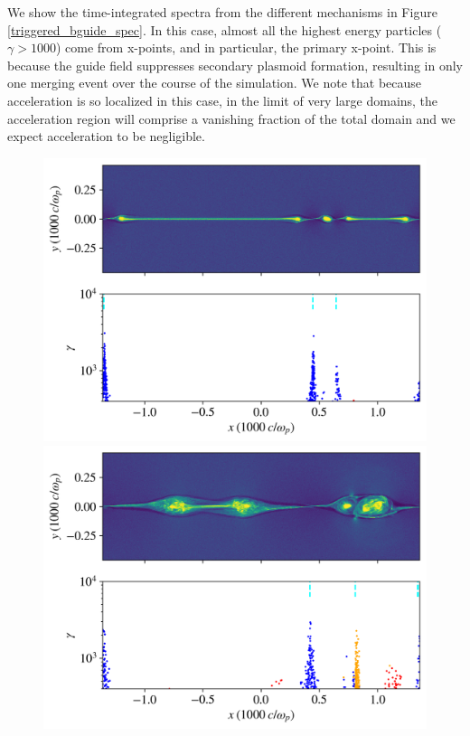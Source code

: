 \documentclass[iop,twocolappendix]{emulateapj}
\begin{document}
We show the time-integrated spectra from the different mechanisms in Figure \ref{triggered_bguide_spec}.  In this case, almost all the highest energy particles ($\gamma > 1000$) come from x-points, and in particular, the primary x-point.  This is because the guide field suppresses secondary plasmoid formation, resulting in only one merging event over the course of the simulation.  We note that because acceleration is so localized in this case, in the limit of very large domains, the acceleration region will comprise a vanishing fraction of the total domain and we expect acceleration to be negligible.  

\begin{figure}[!h]
	{
		\includegraphics[width=\linewidth]{untriggered_bguide_snapshot7.png}
	}
	\newline
	{
		\includegraphics[width=\linewidth]{untriggered_bguide_snapshot12.png}
}
\end{figure}
\end{document}
